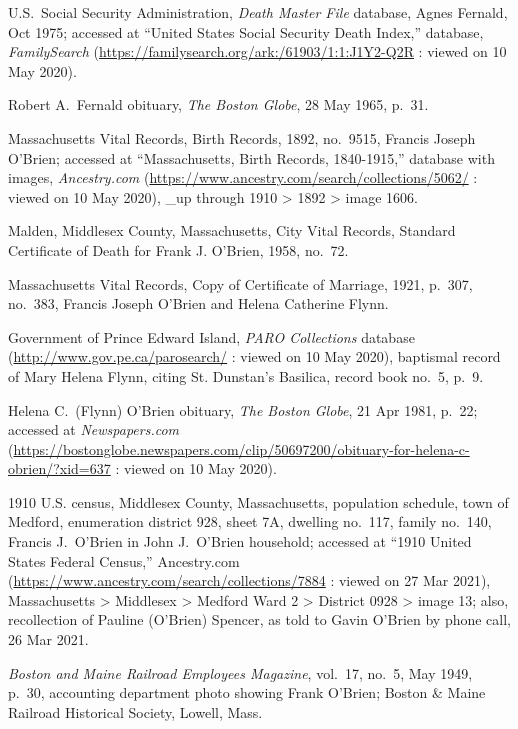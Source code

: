 \begin{thebibliography}{999}
U.S.\ Social Security Administration, \textit{Death Master File} database, Agnes Fernald, Oct 1975; accessed at ``United States Social Security Death Index,'' database, \textit{FamilySearch} (\url{https://familysearch.org/ark:/61903/1:1:J1Y2-Q2R} : viewed on 10 May 2020).

Robert A.\ Fernald obituary, \textit{The Boston Globe}, 28 May 1965, p.\ 31.


Massachusetts Vital Records, Birth Records, 1892, no.\ 9515, Francis Joseph O'Brien; accessed at ``Massachusetts, Birth Records, 1840-1915,'' database with images, \textit{Ancestry.com} (\url{https://www.ancestry.com/search/collections/5062/} : viewed on 10 May 2020), \_up through 1910 > 1892 > image 1606.

Malden, Middlesex County, Massachusetts, City Vital Records, Standard Certificate of Death for Frank J. O'Brien, 1958, no.\ 72.

Massachusetts Vital Records, Copy of Certificate of Marriage, 1921, p.\ 307, no.\ 383, Francis Joseph O'Brien and Helena Catherine Flynn.

Government of Prince Edward Island, \textit{PARO Collections} database (\url{http://www.gov.pe.ca/parosearch/} : viewed on 10 May 2020), baptismal record of Mary Helena Flynn, citing St. Dunstan's Basilica, record book no.\ 5, p.\ 9.

Helena C.\ (Flynn) O'Brien obituary, \textit{The Boston Globe}, 21 Apr 1981, p.\ 22; accessed at \textit{Newspapers.com} (\url{https://bostonglobe.newspapers.com/clip/50697200/obituary-for-helena-c-obrien/?xid=637} : viewed on 10 May 2020).

1910 U.S. census, Middlesex County, Massachusetts, population schedule, town of Medford, enumeration district 928, sheet 7A, dwelling no.\ 117, family no.\ 140, Francis J.\ O'Brien in John J.\ O'Brien household; accessed at  ``1910 United States Federal Census,'' Ancestry.com (\url{https://www.ancestry.com/search/collections/7884} : viewed on 27 Mar 2021), Massachusetts > Middlesex > Medford Ward 2 > District 0928 > image 13; also, recollection of Pauline (O'Brien) Spencer, as told to Gavin O'Brien by phone call, 26 Mar 2021.

\textit{Boston and Maine Railroad Employees Magazine}, vol.\ 17, no.\ 5, May 1949, p.\ 30, accounting department photo showing Frank O'Brien; Boston \& Maine Railroad Historical Society, Lowell, Mass.


\end{thebibliography}

